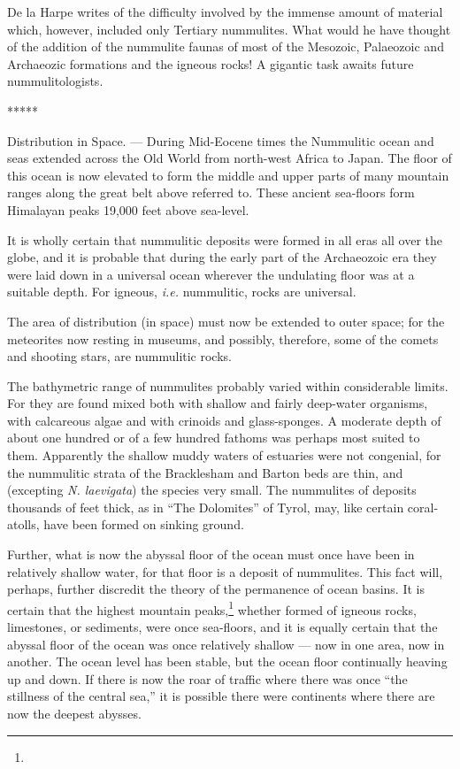 \documentclass[a4paper, 12pt, oneside]{article}
\begin{document}
De la Harpe writes of the difficulty involved by the immense amount of material which, however, included only Tertiary nummulites. What would he have thought of the addition of the nummulite faunas of most of the Mesozoic, Palaeozoic and Archaeozic formations and the igneous rocks! A gigantic task awaits future nummulitologists.

\centerline{*\hspace{15mm}*\hspace{15mm}*\hspace{15mm}*\hspace{15mm}*}
\bigskip

Distribution in Space. --- During Mid-Eocene times the Nummulitic ocean and seas extended across the Old World from north-west Africa to Japan. The floor of this ocean is now elevated to form the middle and upper parts of many mountain ranges along the great belt above referred to. These ancient sea-floors form Himalayan peaks 19,000 feet above sea-level.

It is wholly certain that nummulitic deposits were formed in all eras all over the globe, and it is probable that during the early part of the Archaeozoic era they were laid down in a universal ocean wherever the undulating floor was at a suitable depth. For igneous, \emph{i.e.} nummulitic, rocks are universal.

The area of distribution (in space) must now be extended to outer space; for the meteorites now resting in museums, and possibly, therefore, some of the comets and shooting stars, are nummulitic rocks.

The bathymetric range of nummulites probably varied within considerable limits. For they are found mixed both with shallow and fairly deep-water organisms, with calcareous algae and with crinoids and glass-sponges. A moderate depth of about one hundred or of a few hundred fathoms was perhaps most suited to them. Apparently the shallow muddy waters of estuaries were not congenial, for the nummulitic strata of the Bracklesham and Barton beds are thin, and (excepting \emph{N. laevigata}) the species very small. The nummulites of deposits thousands of feet thick, as in ``The Dolomites'' of Tyrol, may, like certain coral-atolls, have been formed on sinking ground.

Further, what is now the abyssal floor of the ocean must once have been in relatively shallow water, for that floor is a deposit of nummulites. This fact will, perhaps, further discredit the theory of the permanence of ocean basins. It is certain that the highest mountain peaks,\footnote{} whether formed of igneous rocks, limestones, or sediments, were once sea-floors, and it is equally certain that the abyssal floor of the ocean was once relatively shallow --- now in one area, now in another. The ocean level has been stable, but the ocean floor continually heaving up and down. If there is now the roar of traffic where there was once ``the stillness of the central sea,'' it is possible there were continents where there are now the deepest abysses.
\end{document}
